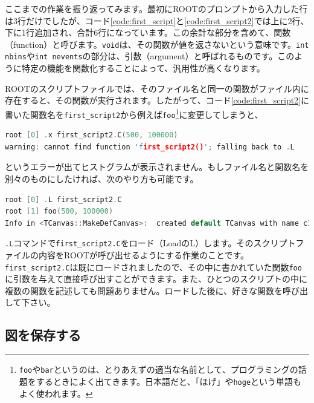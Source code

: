 {ここまでの作業を振り返ってみます。最初にROOTのプロンプトから入力した行は3行だけでしたが、コード\ref{code:first_script}と\ref{code:first_script2}では上に2行、下に1行追加され、合計6行になっています。この余計な部分を含めて、関数（function）と呼びます。\texttt{void}は、その関数が値を返さないという意味です。\texttt{int nbins}や\texttt{int nevents}の部分は、引数（argument）と呼ばれるものです。このように特定の機能を関数化することによって、汎用性が高くなります。

ROOTのスクリプトファイルでは、そのファイル名と同一の関数がファイル内に存在すると、その関数が実行されます。したがって、コード\ref{code:first_script2}に書いた関数名を\texttt{first\_script2}から例えば\texttt{foo}\footnote{\texttt{foo}や\texttt{bar}というのは、とりあえずの適当な名前として、プログラミングの話題をするときによく出てきます。日本語だと、「ほげ」や\texttt{hoge}という単語もよく使われます。}に変更してしまうと、
\begin{lstlisting}[language=c++]
root [0] .x first_script2.C(500, 100000)
warning: cannot find function 'first_script2()'; falling back to .L
\end{lstlisting}
というエラーが出てヒストグラムが表示されません。もしファイル名と関数名を別々のものにしたければ、次のやり方も可能です。
\begin{lstlisting}[language=c++]
root [0] .L first_script2.C
root [1] foo(500, 100000)
Info in <TCanvas::MakeDefCanvas>:  created default TCanvas with name c1
\end{lstlisting}
\texttt{.L}コマンドで\texttt{first\_script2.C}をロード（LoadのL）します。そのスクリプトファイルの内容をROOTが呼び出せるようにする作業のことです。\texttt{first\_script2.C}は既にロードされましたので、その中に書かれていた関数\texttt{foo}に引数を与えて直接呼び出すことができます。また、ひとつのスクリプトの中に複数の関数を記述しても問題ありません。ロードした後に、好きな関数を呼び出して下さい。
\subsection{図を保存する}

}
